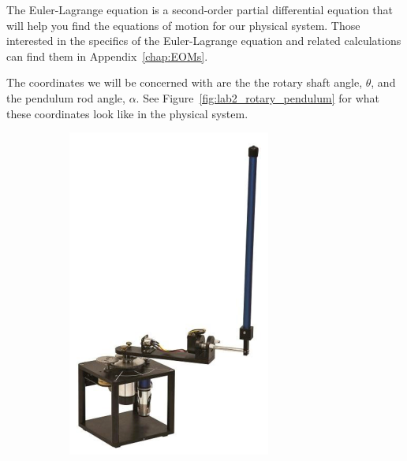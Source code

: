 The Euler-Lagrange equation is a second-order partial differential equation that will help you find the equations of motion for our physical system. Those interested in the specifics of the Euler-Lagrange equation and related calculations can find them in Appendix~\ref{chap:EOMs}.

The coordinates we will be concerned with are the the rotary shaft angle, $\theta$, and the pendulum rod angle, $\alpha$. See Figure~\ref{fig:lab2_rotary_pendulum} for what these coordinates look like in the physical system.

\begin{figure}[H]
    \centering
    \begin{subfigure}{.4\textwidth}
        \centering
        \includegraphics[width=\textwidth]{eps/lab_2/quanser.eps}

\end{subfigure}
\end{figure}
